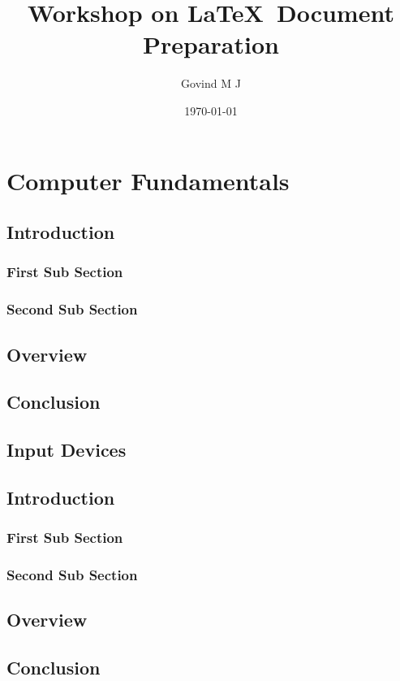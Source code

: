 \documentclass{book}
\title{Workshop on \LaTeX\ Document Preparation}
\author{Govind M J}
\date{\today}
\begin{document}
	\maketitle
	\tableofcontents
	\pagebreak
	\chapter{Computer Fundamentals}
	\setlength{\columnseprule}{1pt}
	\begin{multicols}{3}
		\setcounter{page}{1}
		\section{Introduction}
		\lipsum[2]
		
		\subsection{First Sub Section}
		\lipsum[1-2]
		\subsection{Second Sub Section}
		\lipsum[3-5]
		
		\section{Overview}
		\lipsum[6-6]
		
		\section{Conclusion}
		\lipsum[1]
	\end{multicols}
	
	
	\begin{landscape}
		\chapter{Input Devices}
		\setcounter{page}{1}
		\section{Introduction}
		\lipsum[2]
		
		\subsection{First Sub Section}
		\lipsum[1-2]
		\subsection{Second Sub Section}
		\lipsum[3-5]
		
		\section{Overview}
		\lipsum[6-6]
		
		\section{Conclusion}
		\lipsum[1]
	\end{landscape}
	
\end{document}
